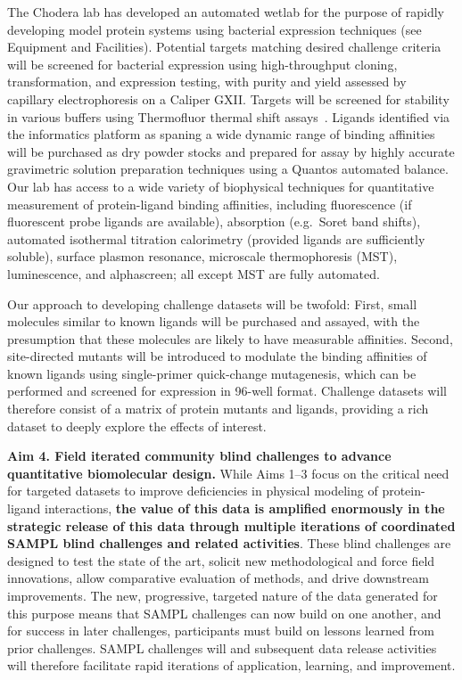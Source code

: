 \documentclass[11pt]{article}
\begin{document}
The Chodera lab has developed an automated wetlab for the purpose of rapidly developing model protein systems using bacterial expression techniques (see Equipment and Facilities).
Potential targets matching desired challenge criteria will be screened for bacterial expression using high-throughput cloning, transformation, and expression testing, with purity and yield assessed by capillary electrophoresis on a Caliper GXII.
Targets will be screened for stability in various buffers using Thermofluor thermal shift assays~\cite{Reinhard:2013:ActaCrystallographicaSectionFStructuralBiologyandCrystallizationCommunications}.
Ligands identified via the informatics platform as spaning a wide dynamic range of binding affinities will be purchased as dry powder stocks and prepared for assay by highly accurate gravimetric solution preparation techniques using a Quantos automated balance.
Our lab has access to a wide variety of biophysical techniques for quantitative measurement of protein-ligand binding affinities, including fluorescence (if fluorescent probe ligands are available), absorption (e.g.~Soret band shifts), automated isothermal titration calorimetry (provided ligands are sufficiently soluble), surface plasmon resonance, microscale thermophoresis (MST), luminescence, and alphascreen; all except MST are fully automated. 

Our approach to developing challenge datasets will be twofold:
First, small molecules similar to known ligands will be purchased and assayed, with the presumption that these molecules are likely to have measurable affinities.
Second, site-directed mutants will be introduced to modulate the binding affinities of known ligands using single-primer quick-change mutagenesis, which can be performed and screened for expression in 96-well format.
Challenge datasets will therefore consist of a matrix of protein mutants and ligands, providing a rich dataset to deeply explore the effects of interest.


{\bf Aim 4. Field iterated community blind challenges to advance quantitative biomolecular design.}
While Aims 1--3 focus on the critical need for targeted datasets to improve deficiencies in physical modeling of protein-ligand interactions, \textbf{the value of this data is amplified enormously in the strategic release of this data through multiple iterations of coordinated SAMPL blind challenges and related activities}.
These blind challenges are designed to test the state of the art, solicit new methodological and force field innovations, allow comparative evaluation of methods, and drive downstream improvements.
The new, progressive, targeted nature of the data generated for this purpose means that SAMPL challenges can now build on one another, and for success in later challenges, participants must build on lessons learned from prior challenges.
SAMPL challenges will and subsequent data release activities will therefore facilitate rapid iterations of application, learning, and improvement.
\end{document}

